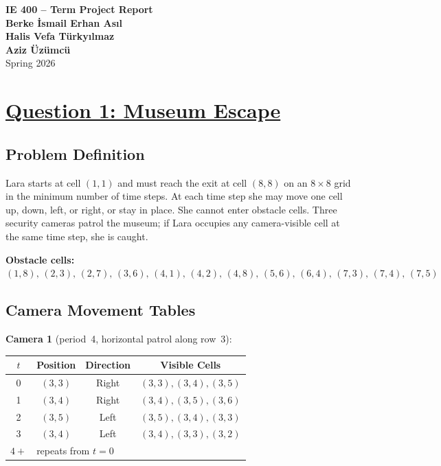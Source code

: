 \documentclass[12pt,a4paper]{article}
\begin{document}
\begin{center}
{\Large\textbf{IE 400 -- Term Project Report}}\\[12pt]
\textbf{Berke İsmail Erhan Asıl} \\[4pt]
\textbf{Halis Vefa Türkyılmaz} \\[4pt]
\textbf{Aziz Üzümcü} \\[12pt]
Spring 2026
\end{center}

\bigskip

\section*{\underline{Question 1: Museum Escape}}

\subsection*{Problem Definition}

Lara starts at cell $(1,1)$ and must reach the exit at cell $(8,8)$ on an
$8\times 8$ grid in the minimum number of time steps. At each time step she may move
one cell up, down, left, or right, or stay in place. She cannot enter obstacle cells.
Three security cameras patrol the museum; if Lara occupies any camera-visible cell at
the same time step, she is caught.

\textbf{Obstacle cells:} $(1,8),\,(2,3),\,(2,7),\,(3,6),\,(4,1),\,(4,2),\,(4,8),\,(5,6),\,(6,4),\,(7,3),\,(7,4),\,(7,5)$

\subsection*{Camera Movement Tables}

\textbf{Camera 1} (period~4, horizontal patrol along row~3):

\begin{center}
\begin{tabular}{cccc}
\toprule
$t$ & Position & Direction & Visible Cells \\
\midrule
0   & $(3,3)$ & Right & $(3,3),(3,4),(3,5)$ \\
1   & $(3,4)$ & Right & $(3,4),(3,5),(3,6)$ \\
2   & $(3,5)$ & Left  & $(3,5),(3,4),(3,3)$ \\
3   & $(3,4)$ & Left  & $(3,4),(3,3),(3,2)$ \\
$4+$ & \multicolumn{3}{l}{repeats from $t=0$} \\
\bottomrule
\end{tabular}
\end{center}
\end{document}
